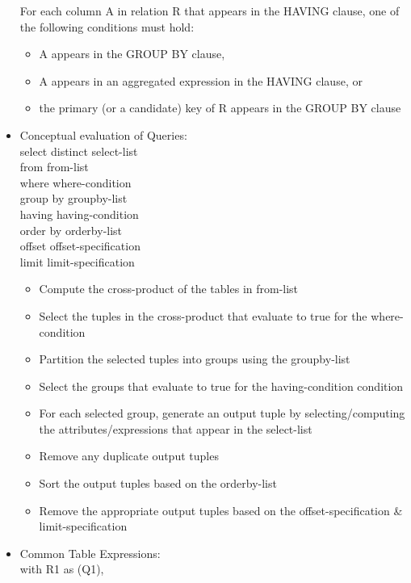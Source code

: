 \documentclass[10pt,landscape,a4paper]{scrartcl}
\begin{document}
\begin{multicols*}{4}
\begin{itemize}
      For each column A in relation R that appears in the HAVING clause, one of the following conditions must hold:
      \begin{itemize}
          \item A appears in the GROUP BY clause,
          \item A appears in an aggregated expression in the HAVING
          clause, or
          \item the primary (or a candidate) key of R appears in the
          GROUP BY clause
      \end{itemize}
      \item Conceptual evaluation of Queries: \\
      select distinct select-list \\
      from from-list \\
      where where-condition \\
      group by groupby-list \\
      having having-condition \\
      order by orderby-list \\
      offset offset-specification \\
      limit limit-specification
      \begin{itemize}
         \item Compute the cross-product of the tables in from-list
         \item Select the tuples in the cross-product that evaluate to true for the where-condition
        \item Partition the selected tuples into groups using the groupby-list
        \item Select the groups that evaluate to true for the having-condition condition
        \item For each selected group, generate an output tuple by selecting/computing the
              attributes/expressions that appear in the select-list
        \item Remove any duplicate output tuples
        \item Sort the output tuples based on the orderby-list
        \item Remove the appropriate output tuples based on the offset-specification \& limit-specification
      \end{itemize}
      \item Common Table Expressions: \\
      with 
        R1 as (Q1), \\

\end{itemize}
\end{multicols*}
\end{document}
